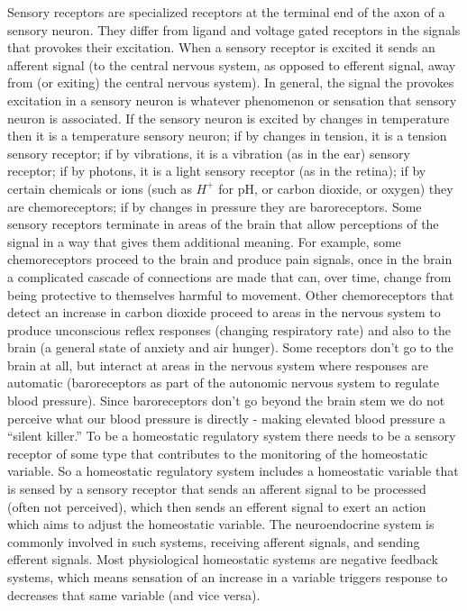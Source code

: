 Sensory receptors are specialized receptors at the terminal end of the axon of a sensory neuron. They differ from ligand and voltage gated receptors in the signals that provokes their excitation. When a sensory receptor is excited it sends an afferent signal (to the central nervous system, as opposed to efferent signal, away from (or exiting) the central nervous system). In general, the signal the provokes excitation in a sensory neuron is whatever phenomenon or sensation that sensory neuron is associated. If the sensory neuron is excited by changes in temperature then it is a temperature sensory neuron; if by changes in tension, it is a tension sensory receptor; if by vibrations, it is a vibration (as in the ear) sensory receptor; if by photons, it is a light sensory receptor (as in the retina); if by certain chemicals or ions (such as $H^+$ for pH, or carbon dioxide, or oxygen) they are chemoreceptors; if by changes in pressure they are baroreceptors. Some sensory receptors terminate in areas of the brain that allow perceptions of the signal in a way that gives them additional meaning. For example, some chemoreceptors proceed to the brain and produce pain signals, once in the brain a complicated cascade of connections are made that can, over time, change from being protective to themselves harmful to movement. Other chemoreceptors that detect an increase in carbon dioxide proceed to areas in the nervous system to produce unconscious reflex responses (changing respiratory rate) and also to the brain (a general state of anxiety and air hunger). Some receptors don’t go to the brain at all, but interact at areas in the nervous system where responses are automatic (baroreceptors as part of the autonomic nervous system to regulate blood pressure). Since baroreceptors don’t go beyond the brain stem we do not perceive what our blood pressure is directly - making elevated blood pressure a “silent killer.” To be a homeostatic regulatory system there needs to be a sensory receptor of some type that contributes to the monitoring of the homeostatic variable. So a homeostatic regulatory system includes a homeostatic variable that is sensed by a sensory receptor that sends an afferent signal to be processed (often not perceived), which then sends an efferent signal to exert an action which aims to adjust the homeostatic variable. The neuroendocrine system is commonly involved in such systems, receiving afferent signals, and sending efferent signals. Most physiological homeostatic systems are negative feedback systems, which means sensation of an increase in a variable triggers response to decreases that same variable (and vice versa).

